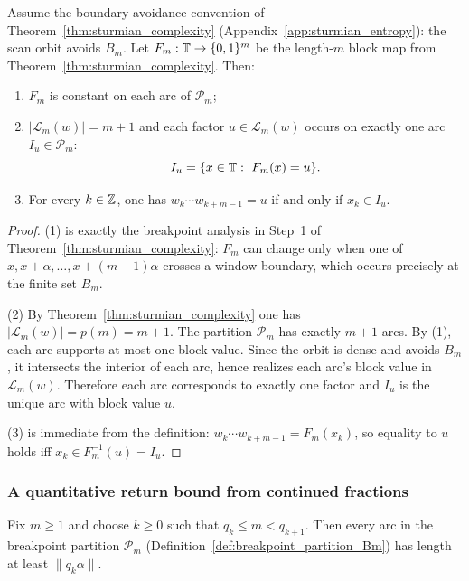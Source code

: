 \begin{lemma}\label{lem:factor_to_unique_arc}
\MathTag Assume the boundary-avoidance convention of Theorem~\ref{thm:sturmian_complexity} (Appendix~\ref{app:sturmian_entropy}): the scan orbit avoids $B_m$.
Let $F_m:\mathbb{T}\to\{0,1\}^m$ be the length-$m$ block map from Theorem~\ref{thm:sturmian_complexity}.
Then:
\begin{enumerate}
\item $F_m$ is constant on each arc of $\mathcal{P}_m$;
\item $|\mathcal{L}_m(w)|=m+1$ and each factor $u\in\mathcal{L}_m(w)$ occurs on exactly one arc $I_u\in\mathcal{P}_m$:
\[
I_u=\{x\in\TT:\ F_m(x)=u\}.
\]
\item For every $k\in\mathbb{Z}$, one has $w_k\cdots w_{k+m-1}=u$ if and only if $x_k\in I_u$.
\end{enumerate}
\end{lemma}

\begin{proof}
(1) is exactly the breakpoint analysis in Step~1 of Theorem~\ref{thm:sturmian_complexity}: $F_m$ can change only when one of $x,x+\alpha,\ldots,x+(m-1)\alpha$ crosses a window boundary, which occurs precisely at the finite set $B_m$.

(2) By Theorem~\ref{thm:sturmian_complexity} one has $|\mathcal{L}_m(w)|=p(m)=m+1$.
The partition $\mathcal{P}_m$ has exactly $m+1$ arcs.
By (1), each arc supports at most one block value.
Since the orbit is dense and avoids $B_m$, it intersects the interior of each arc, hence realizes each arc's block value in $\mathcal{L}_m(w)$.
Therefore each arc corresponds to exactly one factor and $I_u$ is the unique arc with block value $u$.

(3) is immediate from the definition: $w_k\cdots w_{k+m-1}=F_m(x_k)$, so equality to $u$ holds iff $x_k\in F_m^{-1}(u)=I_u$.
\end{proof}

\subsubsection{A quantitative return bound from continued fractions}
\label{subsubsec:sturmian_return_bound_proof}


\begin{lemma}\label{lem:partition_arc_lower_bound_qk}
\MathTag Fix $m\ge 1$ and choose $k\ge 0$ such that $q_k\le m<q_{k+1}$.
Then every arc in the breakpoint partition $\mathcal{P}_m$ (Definition~\ref{def:breakpoint_partition_Bm}) has length at least $\|q_k\alpha\|$.
\end{lemma}

